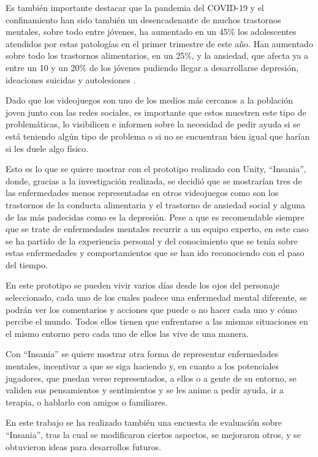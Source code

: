 \documentclass[12pt, a4paper,twoside,titlepage]{book}
\begin{document}
Es también importante destacar que la pandemia del COVID-19 y el confinamiento han sido también un desencadenante de muchos trastornos mentales, sobre todo entre jóvenes, ha aumentado en un 45\% los adolescentes atendidos por estas patologías en el primer trimestre de este año. Han aumentado sobre todo los trastornos alimentarios, en un 25\%, y la ansiedad, que afecta ya a entre un 10 y un 20\% de los jóvenes pudiendo llegar a desarrollarse depresión, ideaciones suicidas y autolesiones \cite{datosEnfJovenes}.  


Dado que los videojuegos son uno de los medios más cercanos a la población joven junto con las redes sociales, es importante que estos muestren este tipo de problemáticas, lo visibilicen e informen sobre la necesidad de pedir ayuda si se está teniendo algún tipo de problema o si no se encuentran bien igual que harían si les duele algo físico. 

Esto es lo que se quiere mostrar con el prototipo realizado con Unity, ``Insania'', donde, gracias a la investigación realizada, se decidió que se mostrarían tres de las enfermedades menos representadas en otros videojuegos como son los trastornos de la conducta alimentaria y el trastorno de ansiedad social y alguna de las más padecidas como es la depresión. Pese a que es recomendable siempre que se trate de enfermedades mentales recurrir a un equipo experto, en este caso se ha partido de la experiencia personal y del conocimiento que se tenía sobre estas enfermedades y comportamientos que se han ido reconociendo con el paso del tiempo. 

En este prototipo se pueden vivir varios días desde los ojos del personaje seleccionado, cada uno de los cuales padece una enfermedad mental diferente, se podrán ver los comentarios y acciones que puede o no hacer cada uno y cómo percibe el mundo. Todos ellos tienen que enfrentarse a las mismas situaciones en el mismo entorno pero cada uno de ellos las vive de una manera. 

Con ``Insania'' se quiere mostrar otra forma de representar enfermedades mentales, incentivar a que se siga haciendo y, en cuanto a los potenciales jugadores, que puedan verse representados, a ellos o a gente de su entorno, se validen sus pensamientos y sentimientos y se les anime a pedir ayuda, ir a terapia, o hablarlo con amigos o familiares. 

En este trabajo se ha realizado también una encuesta de evaluación sobre ``Insania'', tras la cual se modificaron ciertos aspectos, se mejoraron otros, y se obtuvieron ideas para desarrollos futuros.
\end{document}
